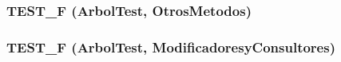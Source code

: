 \subsubsection{\setlength{\rightskip}{0pt plus 5cm}TEST\_\-F ({\bf ArbolTest}, OtrosMetodos)}\label{testarbol_8cpp_451aafd2870b2bc9588723f6cdbe9b73}


\subsubsection{\setlength{\rightskip}{0pt plus 5cm}TEST\_\-F ({\bf ArbolTest}, ModificadoresyConsultores)}\label{testarbol_8cpp_fe8024972e48ff07cefe8ac729b00e40}


